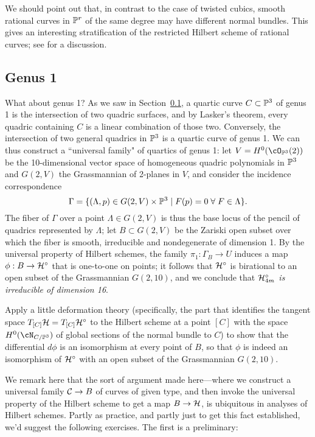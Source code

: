 We should point out that, in contrast to the case of twisted cubics, smooth rational curves in $\PP^r$ of the same degree may have different normal bundles. This gives an interesting stratification of the restricted Hilbert scheme of rational curves; see \cite{Riedl paper?} for a discussion.

\subsection{Genus 1}
What about genus 1? As we saw in Section~\ref{}, a quartic curve $C \subset \PP^3$ of genus 1 is the intersection of two quadric surfaces, and by Lasker's theorem, every quadric containing $C$ is a linear combination of those two. Conversely, the intersection of two general quadrics in $\PP^3$ is a quartic curve of genus 1. We can thus construct a ``universal family" of quartics of genus 1: let $V = H^0(\cO_{\PP^3}(2))$ be the 10-dimensional vector space of homogeneous quadric polynomials in $\PP^3$ and $G(2,V)$ the Grassmannian of 2-planes in $V$, and consider the incidence correspondence
$$
\Gamma = \{ (\Lambda, p) \in G(2,V) \times \PP^3 \mid F(p)=0 \; \forall \; F \in \Lambda \}.
$$
The fiber of $\Gamma$ over a point $\Lambda \in G(2,V)$ is thus the base locus of the pencil of quadrics represented by $\Lambda$; let $B \subset G(2,V)$ be the Zariski open subset over which the fiber is smooth, irreducible and nondegenerate of dimension 1. By the universal property of Hilbert schemes, the family $\pi_1 : \Gamma_B \to U$ induces a map $\phi : B \to \cH^\circ$ that is one-to-one on points; it follows that $\cH^\circ$ is birational to an open subset of the Grassmannian $G(2,10)$, and we conclude that \emph{$\cH^\circ_{4m}$ is irreducible of dimension 16}.

\begin{exercise}
Apply a little deformation theory (specifically, the part that identifies the tangent space $T_{[C]}\cH = T_{[C]}\cH^\circ$ to the Hilbert scheme at a point $[C]$ with the space $H^0(\cN_{C/\PP^3})$ of global sections of the normal bundle to $C$)
to show that the differential $d\phi$ is an isomorphism at every point of $B$, so that $\phi$ is indeed an isomorphism of $\cH^\circ$ with an open subset of the Grassmannian $G(2,10)$.
\end{exercise}

We remark here that the sort of argument made here---where we construct a universal family $\cC \to B$ of curves of given type, and then invoke the universal property of the Hilbert scheme to get a map $B \to \cH$, is ubiquitous in analyses of Hilbert schemes. Partly as practice, and partly just to get this fact established, we'd suggest the following exercises. The first is a preliminary:

